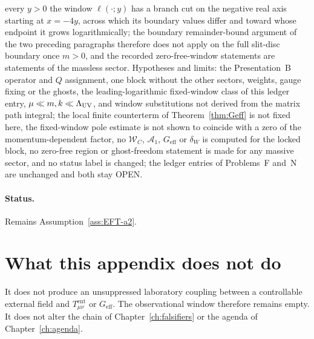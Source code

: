 every \(y>0\) the window \(\ell(\cdot;y)\) has a branch cut on the
negative real axis starting at \(x=-4y\), across which its boundary
values differ and toward whose endpoint it grows logarithmically;
the boundary remainder-bound argument of the two preceding paragraphs
therefore does not apply on the full slit-disc boundary once
\(m>0\), and the recorded zero-free-window statements are statements
of the massless sector. Hypotheses and limits: the Presentation~B
operator and \(Q\) assignment, one block without the other sectors,
weights, gauge fixing or the ghosts, the leading-logarithmic
fixed-window class of this ledger entry, \(\mu\ll m,k\ll\Lambda_{\mathrm{UV}}\), and
window substitutions not derived from the matrix path integral; the
local finite counterterm of Theorem~\ref{thm:Geff} is not fixed here,
the fixed-window pole estimate is not shown to coincide with a zero
of the momentum-dependent factor, no \(\mathcal W_C\),
\(\mathcal A_1\), \(G_{\mathrm{eff}}\) or \(\delta_W\) is computed
for the locked block, no zero-free region or ghost-freedom statement
is made for any massive sector, and no status label is changed; the
ledger entries of Problems~F and~N are unchanged and both stay OPEN.

\paragraph{Status.}
Remains Assumption~\ref{ass:EFT-a2}.

\section{What this appendix does not do}
\label{sec:status-not}

It does not produce an unsuppressed laboratory coupling between a
controllable external field and \(T_{\mu\nu}^{\mathrm{ent}}\) or
\(G_{\mathrm{eff}}\). The observational window therefore remains empty.
It does not alter the chain of Chapter~\ref{ch:falsifiers} or the agenda of
Chapter~\ref{ch:agenda}.
